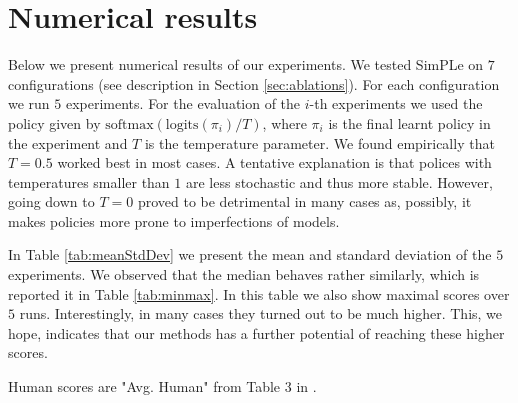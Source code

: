 \clearpage
\appendix

\onecolumn
\section{Numerical results}\label{numerical_results}
Below we present numerical results of our experiments. We tested SimPLe on $7$ configurations (see description in Section \ref{sec:ablations}). For each configuration we run $5$ experiments. For the evaluation of the $i$-th experiments we used the policy given by $\text{softmax}(\text{logits}(\pi_i)/T)$, where  $\pi_i$ is the final learnt policy in the experiment and $T$ is the temperature parameter. We found empirically that $T=0.5$ worked best in most cases. A tentative explanation is that polices with temperatures smaller than $1$ are less stochastic and thus more stable. However, going down to $T=0$ proved to be detrimental in many cases as, possibly, it makes policies more prone to imperfections of models.

In Table \ref{tab:meanStdDev} we present the mean and standard deviation of the $5$ experiments. We observed that the median behaves rather similarly, which is reported it in Table \ref{tab:minmax}. In this table we also show maximal scores over $5$ runs. Interestingly, in many cases they turned out to be much higher. This, we hope, indicates that our methods has a further potential of reaching these higher scores.

Human scores are "Avg. Human" from Table 3 in \cite{Pohlenetal2018}.

